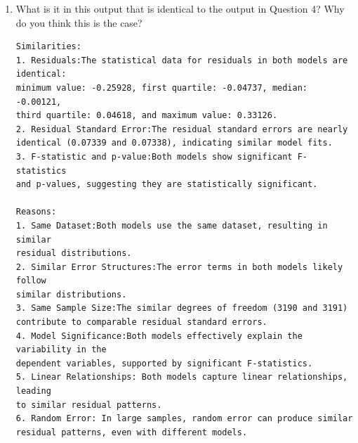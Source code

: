 \documentclass[12pt,letterpaper]{article}
\begin{document}
\begin{enumerate}
		\item What is it in this output that is identical to the output in Question 4? Why do you think this is the case?
			\begin{verbatim}
Similarities:
1. Residuals:The statistical data for residuals in both models are identical:
minimum value: -0.25928, first quartile: -0.04737, median: -0.00121,
third quartile: 0.04618, and maximum value: 0.33126.
2. Residual Standard Error:The residual standard errors are nearly
identical (0.07339 and 0.07338), indicating similar model fits.
3. F-statistic and p-value:Both models show significant F-statistics 
and p-values, suggesting they are statistically significant.
		
Reasons:
1. Same Dataset:Both models use the same dataset, resulting in similar
residual distributions.
2. Similar Error Structures:The error terms in both models likely follow
similar distributions.
3. Same Sample Size:The similar degrees of freedom (3190 and 3191)
contribute to comparable residual standard errors.
4. Model Significance:Both models effectively explain the variability in the
dependent variables, supported by significant F-statistics.
5. Linear Relationships: Both models capture linear relationships, leading
to similar residual patterns.
6. Random Error: In large samples, random error can produce similar
residual patterns, even with different models.
	\end{verbatim}	
		
	\end{enumerate}
\end{document}
